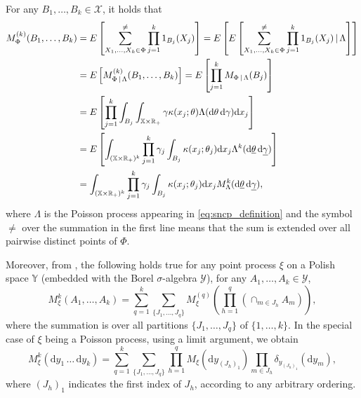 \documentclass[11pt,a4paper,oneside]{article}
\newcommand{\indicator}{\ensuremath{{1}}}
\newcommand{\dd}{\mathrm d}
\newcommand{\E}{E}
\newcommand{\Xcr}{\mathscr{X}}
\newcommand{\Ycr}{\mathscr{Y}}
\newcommand{\X}{\mathbb{X}}
\newcommand{\Y}{\mathbb{Y}}
\newcommand{\R}{\mathbb{R}}
\renewcommand{\mid}{\ensuremath{\,|\,}}
\theoremstyle{definition}
\theoremstyle{remark}
\begin{document}
For any $B_1,\ldots,B_k \in \Xcr$, it holds that
\begin{align}
        M^{(k)}_{\Phi}(B_1,\ldots,B_k) &= \E\left[ \sum_{X_1,\ldots, X_k \in \Phi}^{\neq} \prod_{j=1}^k \indicator_{B_j}(X_j) \right] = \E\left[ \E\left[ \sum_{X_1,\ldots, X_k \in \Phi}^{\neq} \prod_{j=1}^k \indicator_{B_j}(X_j)\mid \Lambda \right] \right] \notag \\
        &= \E\left[ M^{(k)}_{\Phi\mid \Lambda}(B_1,\ldots,B_k) \right] = \E\left[ \prod_{j=1}^k M_{\Phi\mid \Lambda}(B_j) \right]\notag \\
        &= \E\left[ \prod_{j=1}^k \int_{B_j} \int_{\X\times\R_+} \gamma \kappa(x_j; \theta) \Lambda(\dd\theta\, \dd \gamma) \dd x_j \right] \notag \\
        &= \E\left[  \int_{(\X\times\R_+)^k} \prod_{j=1}^k \gamma_j \int_{B_j} \kappa(x_j; \theta_j) \dd x_j \Lambda^k(\dd\underline{\theta} \, \dd \underline{\gamma})  \right] \notag \\
        &= \int_{(\X\times\R_+)^k} \prod_{j=1}^k \gamma_j \int_{B_j} \kappa(x_j; \theta_j) \dd x_j M_{\Lambda}^k(\dd\underline{\theta}\, \dd \underline{\gamma}), \label{eq:k_moment_start}
\end{align}
where $\Lambda$ is the Poisson process appearing in \eqref{eq:sncp_definition} and the symbol $\not =$ over the summation in the first line means that the sum is extended over all pairwise distinct points of $\Phi$.


Moreover, from \cite[Lemma 14.E.4]{BaBlaKa}, the following holds true for any point process $\xi$ on a Polish space $\Y$ (embedded with the Borel $\sigma$-algebra $\Ycr$), for any $A_1,\ldots,A_k \in \Ycr$,
\begin{equation*}
    M_{\xi}^k(A_1,\ldots,A_k) = \sum_{q=1}^k \sum_{\{J_1,\ldots,J_q\}} M_{\xi}^{(q)}\left(\prod_{h=1}^q \left(\cap_{m \in J_h} A_m \right)\right),
\end{equation*}
where the summation is over all partitions $\{J_1,\ldots,J_q\}$ of $\{1,\ldots,k\}$. In the special case of $\xi$ being a Poisson process, using a limit argument, we obtain 
\begin{equation}\label{eq:k_moment_poisson_decomposition}
M_{\xi}^k(\dd y_1\,\ldots\,\dd y_k) = \sum_{q=1}^k \sum_{\{J_1,\ldots,J_q\}} \prod_{h=1}^q M_{\xi}(\dd y_{(J_{h})_1}) \prod_{m \in J_h} \delta_{y_{(J_{h})_1}}(\dd y_m),
\end{equation}
where $(J_{h})_1$ indicates the first index of $J_h$, according to any arbitrary ordering.
\end{document}
